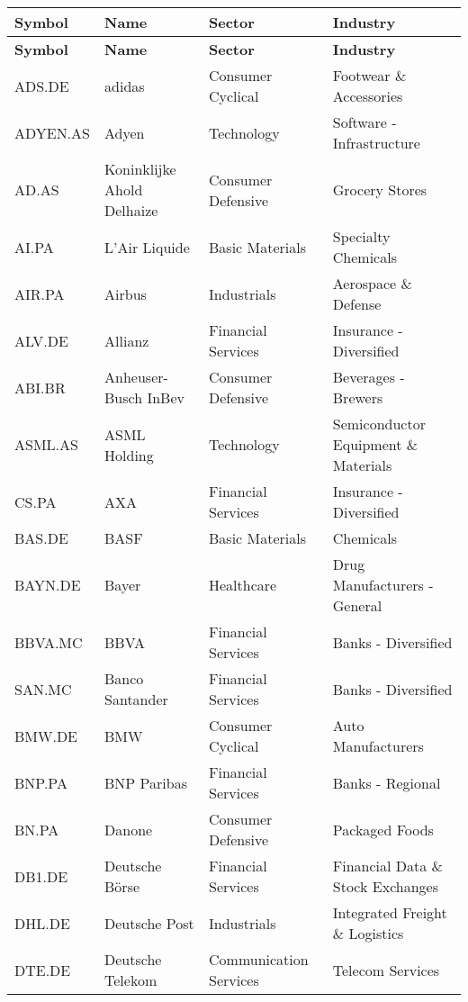 \begin{longtable}{|p{2cm}|p{3cm}|p{4cm}|p{4cm}|}
\hline
\textbf{Symbol} & \textbf{Name} & \textbf{Sector} & \textbf{Industry} \\
\endfirsthead

\hline
\textbf{Symbol} & \textbf{Name} & \textbf{Sector} & \textbf{Industry} \\
\endhead

\endfoot

\hline
ADS.DE & adidas & Consumer Cyclical & Footwear \& Accessories \\ \hline
ADYEN.AS & Adyen & Technology & Software - Infrastructure \\ \hline
AD.AS & Koninklijke Ahold Delhaize & Consumer Defensive & Grocery Stores \\ \hline
AI.PA & L'Air Liquide & Basic Materials & Specialty Chemicals \\ \hline
AIR.PA & Airbus & Industrials & Aerospace \& Defense \\ \hline
ALV.DE & Allianz & Financial Services & Insurance - Diversified \\ \hline
ABI.BR & Anheuser-Busch InBev & Consumer Defensive & Beverages - Brewers \\ \hline
ASML.AS & ASML Holding & Technology & Semiconductor Equipment \& Materials \\ \hline
CS.PA & AXA & Financial Services & Insurance - Diversified \\ \hline
BAS.DE & BASF & Basic Materials & Chemicals \\ \hline
BAYN.DE & Bayer & Healthcare & Drug Manufacturers - General \\ \hline
BBVA.MC & BBVA & Financial Services & Banks - Diversified \\ \hline
SAN.MC & Banco Santander & Financial Services & Banks - Diversified \\ \hline
BMW.DE & BMW & Consumer Cyclical & Auto Manufacturers \\ \hline
BNP.PA & BNP Paribas & Financial Services & Banks - Regional \\ \hline
BN.PA & Danone & Consumer Defensive & Packaged Foods \\ \hline
DB1.DE & Deutsche Börse & Financial Services & Financial Data \& Stock Exchanges \\ \hline
DHL.DE & Deutsche Post & Industrials & Integrated Freight \& Logistics \\ \hline
DTE.DE & Deutsche Telekom & Communication Services & Telecom Services \\ \hline

\end{longtable}
